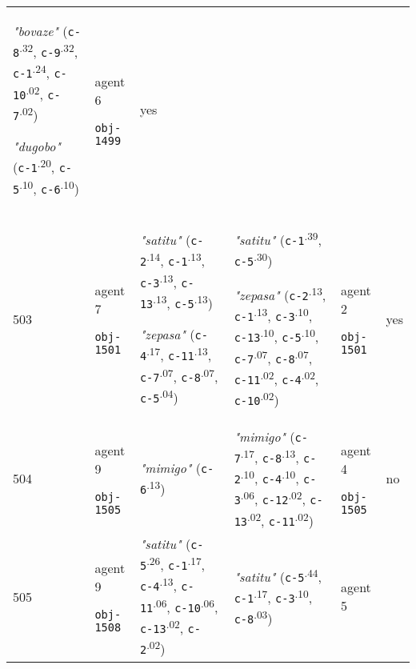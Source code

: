 {\begin{tabular}{@{}p{0.3cm}p{0.9cm}p{6cm}p{6cm}p{0.9cm}p{0.55cm}@{}}
\textit{"bovaze"} (\texttt{c-8}\textsuperscript{.32}, \texttt{c-9}\textsuperscript{.32}, \texttt{c-1}\textsuperscript{.24}, \texttt{c-10}\textsuperscript{.02}, \texttt{c-7}\textsuperscript{.02})

\textit{"dugobo"} (\texttt{c-1}\textsuperscript{.20}, \texttt{c-5}\textsuperscript{.10}, \texttt{c-6}\textsuperscript{.10}) & agent 6 

 \texttt{obj-1499} & yes \\
503 & agent 7 

\texttt{obj-1501} &\textit{"satitu"} (\texttt{c-2}\textsuperscript{.14}, \texttt{c-1}\textsuperscript{.13}, \texttt{c-3}\textsuperscript{.13}, \texttt{c-13}\textsuperscript{.13}, \texttt{c-5}\textsuperscript{.13})

\textit{"zepasa"} (\texttt{c-4}\textsuperscript{.17}, \texttt{c-11}\textsuperscript{.13}, \texttt{c-7}\textsuperscript{.07}, \texttt{c-8}\textsuperscript{.07}, \texttt{c-5}\textsuperscript{.04}) & \textit{"satitu"} (\texttt{c-1}\textsuperscript{.39}, \texttt{c-5}\textsuperscript{.30})

\textit{"zepasa"} (\texttt{c-2}\textsuperscript{.13}, \texttt{c-1}\textsuperscript{.13}, \texttt{c-3}\textsuperscript{.10}, \texttt{c-13}\textsuperscript{.10}, \texttt{c-5}\textsuperscript{.10}, \texttt{c-7}\textsuperscript{.07}, \texttt{c-8}\textsuperscript{.07}, \texttt{c-11}\textsuperscript{.02}, \texttt{c-4}\textsuperscript{.02}, \texttt{c-10}\textsuperscript{.02}) & agent 2 

 \texttt{obj-1501} & yes \\
504 & agent 9 

\texttt{obj-1505} &\textit{"mimigo"} (\texttt{c-6}\textsuperscript{.13}) & \textit{"mimigo"} (\texttt{c-7}\textsuperscript{.17}, \texttt{c-8}\textsuperscript{.13}, \texttt{c-2}\textsuperscript{.10}, \texttt{c-4}\textsuperscript{.10}, \texttt{c-3}\textsuperscript{.06}, \texttt{c-12}\textsuperscript{.02}, \texttt{c-13}\textsuperscript{.02}, \texttt{c-11}\textsuperscript{.02}) & agent 4 

 \texttt{obj-1505} & no \\
505 & agent 9 

\texttt{obj-1508} &\textit{"satitu"} (\texttt{c-5}\textsuperscript{.26}, \texttt{c-1}\textsuperscript{.17}, \texttt{c-4}\textsuperscript{.13}, \texttt{c-11}\textsuperscript{.06}, \texttt{c-10}\textsuperscript{.06}, \texttt{c-13}\textsuperscript{.02}, \texttt{c-2}\textsuperscript{.02}) & \textit{"satitu"} (\texttt{c-5}\textsuperscript{.44}, \texttt{c-1}\textsuperscript{.17}, \texttt{c-3}\textsuperscript{.10}, \texttt{c-8}\textsuperscript{.03}) & agent 5 


\end{tabular}}
